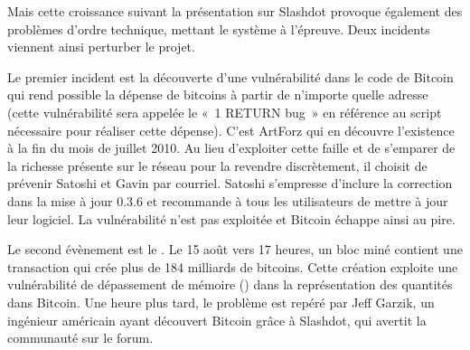 
Mais cette croissance suivant la présentation sur Slashdot provoque également des problèmes d'ordre technique, mettant le système à l'épreuve. Deux incidents viennent ainsi perturber le projet.

Le premier incident est la découverte d'une vulnérabilité dans le code de Bitcoin qui rend possible la dépense de bitcoins à partir de n'importe quelle adresse (cette vulnérabilité sera appelée le «~1 RETURN bug~» en référence au script nécessaire pour réaliser cette dépense). C'est ArtForz qui en découvre l'existence à la fin du mois de juillet 2010. Au lieu d'exploiter cette faille et de s'emparer de la richesse présente sur le réseau pour la revendre discrètement, il choisit de prévenir Satoshi et Gavin par courriel. Satoshi s'empresse d'inclure la correction dans la mise à jour 0.3.6 et recommande à tous les utilisateurs de mettre à jour leur logiciel. La vulnérabilité n'est pas exploitée et Bitcoin échappe ainsi au pire.

Le second évènement est le . Le 15 août vers 17 heures, un bloc miné contient une transaction qui crée plus de 184 milliards de bitcoins. Cette création exploite une vulnérabilité de dépassement de mémoire () dans la représentation des quantités dans Bitcoin. Une heure plus tard, le problème est repéré par Jeff Garzik, un ingénieur américain ayant découvert Bitcoin grâce à Slashdot, qui avertit la communauté sur le forum.

